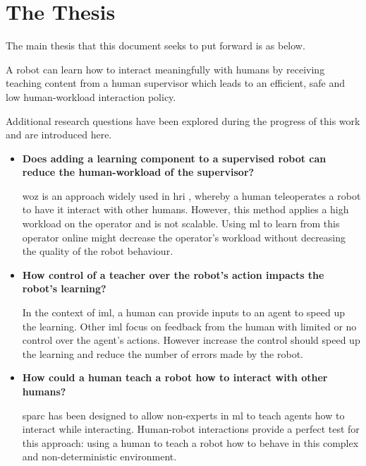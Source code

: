 \section{The Thesis}\label{sec:intro-thesis}
The main thesis that this document seeks to put forward is as below.

A robot can learn how to interact meaningfully with humans by receiving teaching
content from a human supervisor which leads to an efficient, safe and
low human-workload interaction policy.

Additional research questions have been explored during the progress of this
work and are introduced here.

\begin{itemize}
    \item \textbf{Does adding a learning component to a supervised robot can reduce the human-workload of the supervisor?}
    
        \gls{woz} is an approach widely used in \gls{hri} \citep{riek2012wizard}, whereby a human teleoperates a robot to have it interact with other humans. However, this method applies a high workload on the operator and is not scalable. Using \gls{ml} to learn from this operator online might decrease the operator's workload without decreasing the quality of the robot behaviour.
    
    \item \textbf{How control of a teacher over the robot's action impacts the robot's learning?} 
    
	    In the context of \gls{iml}, a human can provide inputs to an agent to speed up the learning. Other \gls{iml} \citep{thomaz2008teachable,knox2009interactively} focus on feedback from the human with limited or no control over the agent's actions. However increase the control should speed up the learning and reduce the number of errors made by the robot.

    \item \textbf{How could a human teach a robot how to interact with other humans?}

	 \gls{sparc} has been designed to allow non-experts in \gls{ml} to teach agents how to interact while interacting. Human-robot interactions provide a perfect test for this approach: using a human to teach a robot how to behave in this complex and non-deterministic environment.


\end{itemize}

